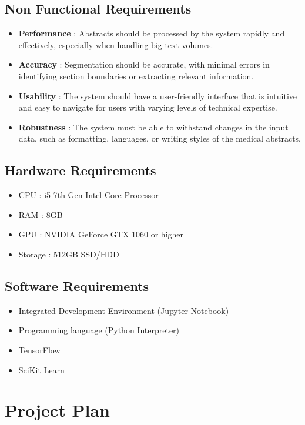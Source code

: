 \documentclass[12pt,a4paper]{report}     %
\begin{document}
\begin{normalsize}
{\subsection{Non Functional Requirements}
\begin{itemize}
    \item \textbf{Performance} : Abstracts should be processed by the system rapidly and effectively, especially when handling big text volumes.
    \item \textbf{Accuracy} : Segmentation should be accurate, with minimal errors in identifying section boundaries or extracting relevant information.
    \item \textbf{Usability} : The system should have a user-friendly interface that is intuitive and easy to navigate for users with varying levels of technical expertise.
    \item \textbf{Robustness} : The system must be able to withstand changes in the input data, such as formatting, languages, or writing styles of the medical abstracts.

\end{itemize}
\subsection{Hardware Requirements}
\begin{itemize}
    \item CPU : i5 7th Gen Intel Core Processor
    \item RAM : 8GB 
    \item GPU : NVIDIA GeForce GTX 1060 or higher 
    \item Storage : 512GB SSD/HDD
\end{itemize}


\subsection{Software Requirements}
\begin{itemize}
    \item Integrated Development Environment (Jupyter Notebook)
    \item Programming language (Python Interpreter)
    \item TensorFlow
    \item SciKit Learn

\end{itemize}
\newpage
\section{Project Plan}

}
\end{normalsize}
\end{document}
